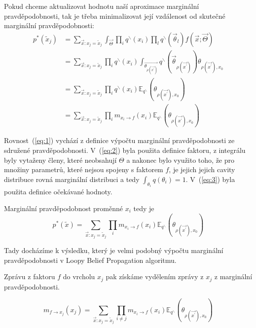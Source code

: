 Pokud chceme aktualizovat hodnotu naší aproximace marginální pravděpodobnosti,
tak je třeba minimalizovat její vzdálenost od skutečné marginální
pravděpodobnosti:
\begin{align}
p^*(\tilde{x}_j) &=
\sum_{\vec{x}: x_j = \tilde{x}_j}
	\int_{\vec{\Theta}}
    		\prod_i 
			q^\backslash(x_i)
		\prod_l 
			q^\backslash(\vec{\theta}_l)
		f(\vec{x};
    		  \vec{\Theta})
\label{eq:1} 
\\
&=
\sum_{\vec{x}: x_j = \tilde{x}_j} 
	\prod_i 
		q^\backslash(x_i)
    \int_{\vec{\theta_{\rho(\vec{x^\prime})}}}
	    q^\backslash(\vec{\theta}_{\rho(\vec{x^\prime})})
    \theta_{\rho(\vec{x^\prime}), x_0} \label{eq:2} 
\\
&= 
\sum_{\vec{x}: x_j = \tilde{x}_j} 
	\prod_i 
		q^\backslash(x_i)
    		\mathbb{E}_{q^\backslash} 
			(\theta_{\rho(\vec{x^\prime}), x_0}) 
\label{eq:3}
\\
&= 
\sum_{\vec{x}: x_j = \tilde{x}_j} 
	\prod_i 
		m_{x_i \rightarrow f}(x_i)
    		\mathbb{E}_{q^\backslash} 
			(\theta_{\rho(\vec{x^\prime}), x_0}) 
\end{align}

Rovnost~(\ref{eq:1}) vychází z definice výpočtu marginální pravděpodobnosti ze
sdružené pravděpodobnosti.
V~(\ref{eq:2}) byla použita definice faktoru, z integrálu byly vytaženy členy,
které neobsahují $\Theta$ a nakonec bylo využito toho, že pro
množiny parametrů, které nejsou spojeny s faktorem $f$, je jejich jejich cavity
distribuce rovná marginální distribuci a tedy $\int_{\theta_i} q(\theta_i) =
1$. V~(\ref{eq:3}) byla použita definice očekávané hodnoty.

Marginální pravděpodobnost proměnné $x_i$ tedy je
\begin{equation}
p^*(\tilde x) =
\sum_{\vec{x}: x_j = \tilde{x}_j} 
	\prod_i 
		m_{x_i \rightarrow f}(x_i)
    		\mathbb{E}_{q^\backslash} 
			(\theta_{\rho(\vec{x^\prime}), x_0}) 
\end{equation}

Tady docházíme k výsledku, který je velmi podobný výpočtu marginální
pravděpodobnosti v Loopy Belief Propagation algoritmu.

Zprávu z faktoru $f$ do vrcholu $x_j$ pak získáme vydělením zprávy z $x_j$ z
marginální pravděpodobnosti.

\begin{equation}
m_{f \rightarrow x_j}(x_j) =
    \sum_{\vec{x}: x_j = \tilde{x}_j}
        \prod_{i \ne j}
            m_{x_i \rightarrow f}(x_i)
            \mathbb{E}_{q^\backslash}
                (\theta_{\rho(\vec{x^\prime}), x_0})
\label{eq:msgfromftox}
\end{equation}

